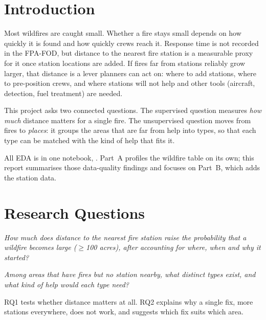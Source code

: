 \documentclass[10pt,twocolumn,letterpaper]{article}
\newcommand{\code}[1]{\texttt{\detokenize{#1}}}
\begin{document}
\section{Introduction}
Most wildfires are caught small. Whether a fire stays small depends on how quickly it is found and how quickly crews reach it. Response time is not recorded in the FPA-FOD, but distance to the nearest fire station is a measurable proxy for it once station locations are added. If fires far from stations reliably grow larger, that distance is a lever planners can act on: where to add stations, where to pre-position crews, and where stations will not help and other tools (aircraft, detection, fuel treatment) are needed.

This project asks two connected questions. The supervised question measures \emph{how much} distance matters for a single fire. The unsupervised question moves from fires to \emph{places}: it groups the areas that are far from help into types, so that each type can be matched with the kind of help that fits it.

All EDA is in one notebook, \code{milestone1_eda.ipynb}. Part~A profiles the wildfire table on its own; this report summarises those data-quality findings and focuses on Part~B, which adds the station data.

\section{Research Questions}
\begin{description}[leftmargin=0pt]
\item[RQ1 (supervised, classification).] \emph{How much does distance to the nearest fire station raise the probability that a wildfire becomes large ($\geq$100 acres), after accounting for where, when and why it started?}
\item[RQ2 (unsupervised, clustering).] \emph{Among areas that have fires but no station nearby, what distinct types exist, and what kind of help would each type need?}
\end{description}
RQ1 tests whether distance matters at all. RQ2 explains why a single fix, more stations everywhere, does not work, and suggests which fix suits which area.
\end{document}
